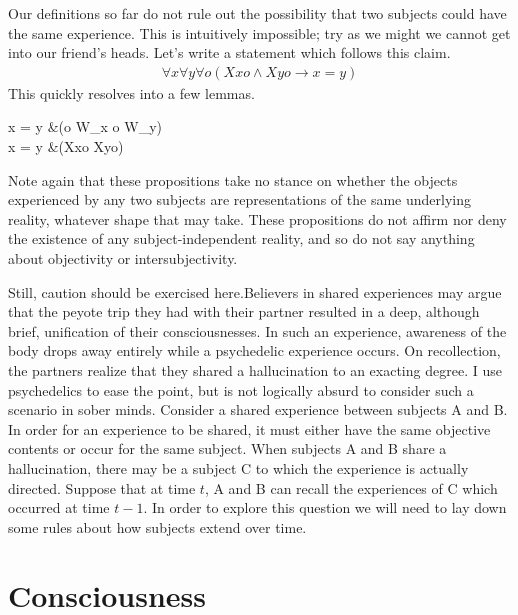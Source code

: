 \documentclass[leqno]{article}
\newcounter{lemma}
\begin{document}
	Our definitions so far do not rule out the possibility that two subjects could
	have the same experience. This is intuitively impossible; try as we might we cannot
	get into our friend's heads. Let's write a statement which follows this claim. %
	\begin{align}
		\label{prop:subject-identity}                                    %
		\forall x \forall y \forall o ( Xxo \land Xyo \rightarrow x = y)
	\end{align}%
	\noindent
	This quickly resolves into a few lemmas.%
	\begin{lemmalist}
		\label{prop:world-exclusion} %
		x \not= y &\rightarrow (o \in W_x \rightarrow o \not\in W_y) \\ \label{prop:experience-exclusion} %
		x \not= y &\rightarrow \neg(Xxo \land Xyo)
	\end{lemmalist}%
	Note again that these propositions take no stance on whether the objects
	experienced by any two subjects are representations of the same underlying
	reality, whatever shape that may take. These propositions do not affirm nor
	deny the existence of any subject-independent reality, and so do not say anything
	about objectivity or intersubjectivity.

	Still, caution should be exercised here.Believers
	in shared experiences may argue that the peyote trip they had with their
	partner resulted in a deep, although brief, unification of their
	consciousnesses. In such an experience, awareness of the body drops away
	entirely while a psychedelic experience occurs. On recollection, the partners
	realize that they shared a hallucination to an exacting degree. I use psychedelics
	to ease the point, but is not logically absurd to consider such a scenario in
	sober minds. Consider a shared experience between subjects A and B. In order
	for an experience to be shared, it must either have the same objective contents
	or occur for the same subject. When subjects A and B share a hallucination, there
	may be a subject C to which the experience is actually directed. Suppose that
	at time $t$, A and B can recall the experiences of C which occurred at time $t-
	1$. In order to explore this question we will need to lay down some rules
	about how subjects extend over time.

	\section{Consciousness}
\end{document}
